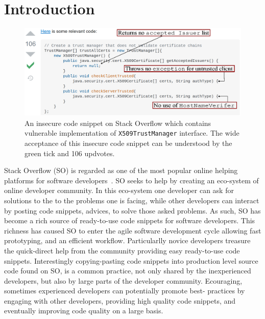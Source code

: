 \section{Introduction}
   \label{into}

   \begin{figure}
   \includegraphics[width=\linewidth]{Figures/SO_ss.eps}
   \caption{An  insecure code snippet on Stack Overflow which contains vulnerable implementation of \texttt{X509TrustManager} interface. 
   The wide acceptance of this insecure code snippet can be understood by the green tick and 106 updvotes.}
   \label{fig:SO_screenshot}
   \end{figure}
   
   Stack Overflow (SO) is regarded as one of the most popular online helping platforms for software developers~\cite{8816778}. 
   SO seeks to help by creating an eco-system of online developer community. 
   In this eco-system one developer can ask for solutions to the to the problems one is facing, while other developers can interact by posting code snippets, advices, to solve those asked problems. 
   As such, SO has become a rich source of ready-to-use code snippets for software developers. 
   This richness has caused SO to enter the agile software development cycle allowing fast prototyping, and an efficient workflow. 
   Particularlly novice developers treasure the quick-direct help from the community providing easy ready-to-use code snippets.
   Interestingly copying-pasting code snippets into production level source code found on SO, is a common practice, not only shared by the inexperienced developers, but also by large parts of the developer community. 
   Ecouraging, sometimes experienced developers can potentially promote best- practices by engaging with other developers, providing high quality code snippets, and eventually improving code quality on a large basis.

